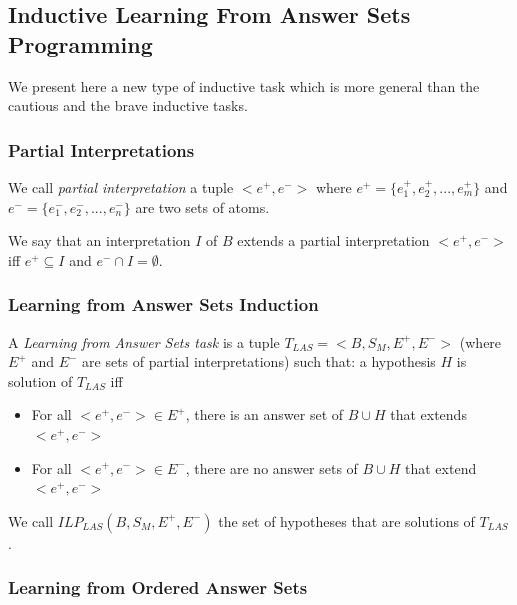 
\subsection{Inductive Learning From Answer Sets Programming}

We present here a new type of inductive task which is more general than the cautious and the brave inductive tasks.

\subsubsection{Partial Interpretations}

We call \textit{partial interpretation} a tuple $<e^+,e^->$ where $e^+=\{e^+_1,e^+_2,...,e^+_m\}$ and $e^-=\{e^-_1,e^-_2,...,e^-_n\}$ are two sets of atoms.

\smallskip

We say that an interpretation $I$ of $B$ extends a partial interpretation $<e^+,e^->$ iff $e^+ \subseteq I$ and $e^- \cap I = \emptyset$.

\subsubsection{Learning from Answer Sets Induction}

\begin{definition}

A \textit{Learning from Answer Sets task} is a tuple $T_{LAS}=<B, S_M, E^+, E^->$ (where $E^+$ and $E^-$ are sets of partial interpretations) such that: a hypothesis $H$ is solution of $T_{LAS}$ iff 
\begin{itemize}
\item For all  $<e^+,e^->\in E^+$, there is an answer set of $B\cup H$ that extends $<e^+,e^->$
\item For all  $<e^+,e^->\in E^-$, there are no answer sets of $B\cup H$ that extend $<e^+,e^->$
\end{itemize}

We call $ILP_{LAS}(B,S_M,E^+,E^-)$ the set of hypotheses that are solutions of $T_{LAS}$. 
\end{definition}

\begin{example}

\end{example}

\subsubsection{Learning from Ordered Answer Sets}

